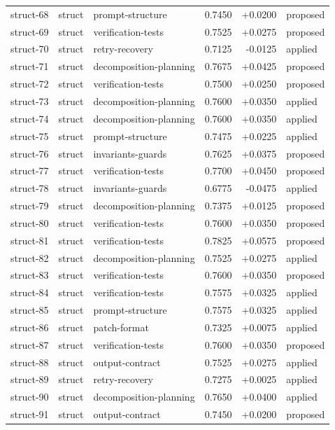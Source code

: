 \begin{center}
\begin{longtable}{llp{5.2cm}rrl}
struct-68 & struct & prompt-structure & 0.7450 & +0.0200 & proposed \\
struct-69 & struct & verification-tests & 0.7525 & +0.0275 & proposed \\
struct-70 & struct & retry-recovery & 0.7125 & -0.0125 & applied \\
struct-71 & struct & decomposition-planning & 0.7675 & +0.0425 & proposed \\
struct-72 & struct & verification-tests & 0.7500 & +0.0250 & proposed \\
struct-73 & struct & decomposition-planning & 0.7600 & +0.0350 & applied \\
struct-74 & struct & decomposition-planning & 0.7600 & +0.0350 & applied \\
struct-75 & struct & prompt-structure & 0.7475 & +0.0225 & applied \\
struct-76 & struct & invariants-guards & 0.7625 & +0.0375 & proposed \\
struct-77 & struct & verification-tests & 0.7700 & +0.0450 & proposed \\
struct-78 & struct & invariants-guards & 0.6775 & -0.0475 & applied \\
struct-79 & struct & decomposition-planning & 0.7375 & +0.0125 & proposed \\
struct-80 & struct & verification-tests & 0.7600 & +0.0350 & proposed \\
struct-81 & struct & verification-tests & 0.7825 & +0.0575 & proposed \\
struct-82 & struct & decomposition-planning & 0.7525 & +0.0275 & applied \\
struct-83 & struct & verification-tests & 0.7600 & +0.0350 & proposed \\
struct-84 & struct & verification-tests & 0.7575 & +0.0325 & applied \\
struct-85 & struct & prompt-structure & 0.7575 & +0.0325 & applied \\
struct-86 & struct & patch-format & 0.7325 & +0.0075 & applied \\
struct-87 & struct & verification-tests & 0.7600 & +0.0350 & proposed \\
struct-88 & struct & output-contract & 0.7525 & +0.0275 & applied \\
struct-89 & struct & retry-recovery & 0.7275 & +0.0025 & applied \\
struct-90 & struct & decomposition-planning & 0.7650 & +0.0400 & applied \\
struct-91 & struct & output-contract & 0.7450 & +0.0200 & proposed \\

\end{longtable}
\end{center}
